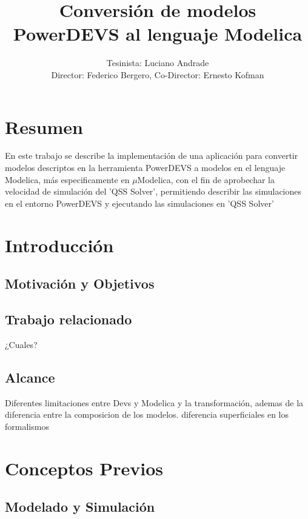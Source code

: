\documentclass[a4paper,	11pt]{article}
\begin{document}
\renewcommand\floatpagefraction{.9}
\renewcommand\topfraction{.9}
\renewcommand\bottomfraction{.9}
\renewcommand\textfraction{.1}
\setcounter{totalnumber}{50}
\setcounter{topnumber}{50}
\setcounter{bottomnumber}{50}

\title{Conversión de modelos PowerDEVS al lenguaje Modelica}
\author{Tesinista: Luciano Andrade \\ Director: Federico Bergero, Co-Director: Ernesto Kofman} 

\maketitle
\section{Resumen}
En este trabajo se describe la implementación de una aplicación para convertir modelos descriptos en la herramienta PowerDEVS a modelos en el lenguaje Modelica, más especificamente en $\mu$Modelica, con el fin de aprobechar la velocidad de simulación del 'QSS Solver', permitiendo describir las simulaciones en el entorno PowerDEVS y ejecutando las simulaciones en 'QSS Solver'


\section{Introducción}
\subsection{Motivación y Objetivos}


\subsection{Trabajo relacionado}
¿Cuales?
\subsection{Alcance}
 Diferentes limitaciones entre Devs y Modelica y la transformación, ademas de la diferencia entre la composicion de los modelos.
 diferencia superficiales en los formalismos

\section{Conceptos Previos}
\subsection{Modelado y Simulación}
\end{document}
